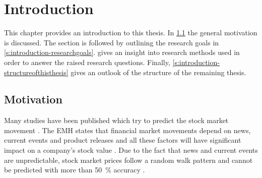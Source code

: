 
\chapter{Introduction}
\label{c:introduction}




This chapter provides an introduction to this thesis.
In \cref{s:introduction-motivation} the general motivation is discussed.
The section is followed by outlining the research goals in \cref{s:introduction-researchgoals}.
 gives an insight into research methods used in order to answer the raised research questions.
Finally, \cref{s:introduction-structureofthisthesis} gives an outlook of the structure of the remaining thesis.

\section{Motivation}
\label{s:introduction-motivation}

Many studies have been published which try to predict the stock market movement \citep[see][]{Mittal2012a,Nguyen2015a,Pagolu2016a,Zhang2011a}.
The \ac{EMH} states that financial market movements depend on news, current events and product releases and all these factors will have significant impact on a company's stock value
\citep{fama1965behavior}.
Due to the fact that news and current events are unpredictable, stock market prices follow a random walk pattern and cannot be predicted with more than \SI{50}{\percent} accuracy
\citep{Pagolu2016a}.

